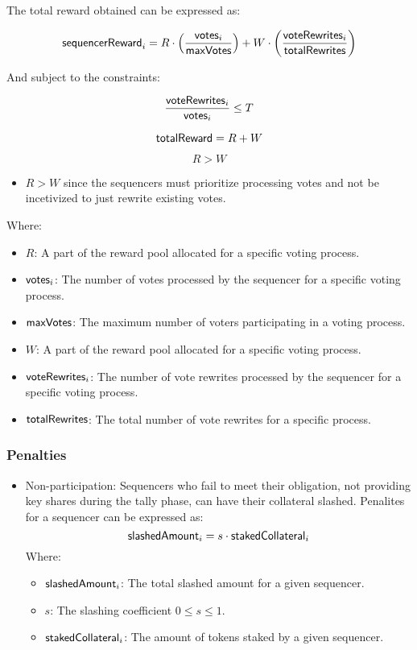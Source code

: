 The total reward obtained can be expressed as:

$$ {\sf{sequencerReward}}_i = R \cdot \left( \frac{{\sf{votes}}_i}{{\sf{maxVotes}}} \right) + W \cdot \left( \frac{{\sf{voteRewrites}}_i}{{\sf{totalRewrites}}}  \right) $$

And subject to the constraints:

$$ \frac{{\sf{voteRewrites}}_i}{{\sf{votes}}_i} \leq T$$

$$ {\sf{totalReward}} = R + W $$

$$ R > W $$

\begin{itemize}
	\item $R > W$ since the sequencers must prioritize processing votes and not be incetivized to just rewrite existing votes.
\end{itemize}

Where:

\begin{itemize}
	\item $R$: A part of the reward pool allocated for a specific voting process.
	\item ${\sf{votes}}_i$: The number of votes processed by the sequencer for a specific voting process.
	\item ${\sf{maxVotes}}$: The maximum number of voters participating in a voting process.
	\item $W$: A part of the reward pool allocated for a specific voting process.
	\item ${\sf{voteRewrites}}_i$: The number of vote rewrites processed by the sequencer for a specific voting process.
	\item ${\sf{totalRewrites}}$: The total number of vote rewrites for a specific process.
\end{itemize}

\subsubsection{Penalties}

\begin{itemize}
	\item Non-participation: Sequencers who fail to meet their obligation, not providing key shares during the tally phase, can have their collateral slashed.
	Penalites for a sequencer can be expressed as:
	$$ {\sf{slashedAmount}}_i = s \cdot {\sf{stakedCollateral}}_i $$
	Where:
	\begin{itemize}
		\item ${\sf{slashedAmount}}_i$: The total slashed amount for a given sequencer.
		\item $s$: The slashing coefficient $0 \leq s \leq 1$.
		\item ${\sf{stakedCollateral}}_i$: The amount of \token tokens staked by a given sequencer.
	\end{itemize}
\end{itemize}

